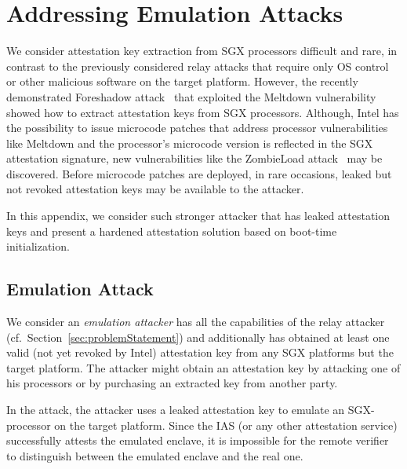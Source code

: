 

\section{Addressing Emulation Attacks}
\label{sec:variantII}

We consider attestation key extraction from SGX processors difficult and rare, in contrast to the previously considered relay attacks that require only OS control or other malicious software on the target platform. However, the recently demonstrated Foreshadow attack~\cite{foreshadow-usenix18} that exploited the Meltdown vulnerability~\cite{Lipp2018meltdown} showed how to extract attestation keys from SGX processors. Although, Intel has the possibility to issue microcode patches that address processor vulnerabilities like Meltdown and the processor's microcode version is reflected in the SGX attestation signature, new vulnerabilities like the ZombieLoad attack~\cite{ZombieLoad} may be discovered. Before microcode patches are deployed, in rare occasions, leaked but not revoked attestation keys may be available to the attacker.

In this appendix, we consider such stronger attacker that has leaked attestation keys and present a hardened attestation solution based on boot-time initialization.

\subsection{Emulation Attack} 

 We consider an \emph{emulation attacker} has all the capabilities of the relay attacker (cf.\ Section~\ref{sec:problemStatement}) and additionally has obtained at least one valid (not yet revoked by Intel) attestation key from any SGX platforms but the target platform. The attacker might obtain an attestation key by attacking one of his processors or by purchasing an extracted key from another party. 

In the attack, the attacker uses a leaked attestation key to emulate an SGX-processor on the target platform. 
Since the IAS (or any other attestation service) successfully attests the emulated enclave, it is impossible for the remote verifier to distinguish between the emulated enclave and the real one. 


